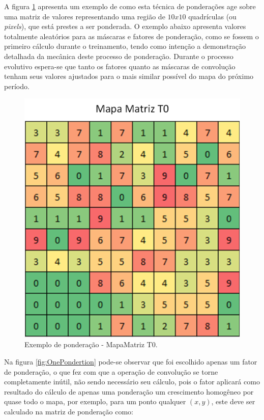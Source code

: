 A figura \ref{fig:MapaMatrizT0} apresenta um exemplo de como esta técnica de ponderações age sobre uma matriz de valores representando uma região de \(10x10\) quadrículas (ou \emph{pixels}), que está prestes a ser ponderada. O exemplo abaixo apresenta valores totalmente aleatórios para as máscaras e fatores de ponderação, como se fossem o primeiro cálculo durante o treinamento, tendo como intenção a demonstração detalhada da mecânica deste processo de ponderação. Durante o processo evolutivo espera-se que tanto os fatores quanto as máscaras de convolução tenham seus valores ajustados para o mais similar possível do mapa do próximo período. 

\begin{figure}[h]
	\centering	\includegraphics[scale=0.6]{Figuras/PonderationsExample-MatrixMap.png}
\caption{Exemplo de ponderação - MapaMatriz T0.}
\label{fig:MapaMatrizT0}
\end{figure}

Na figura \ref{fig:OnePondertion} pode-se observar que foi escolhido apenas um fator de ponderação, o que fez com que a operação de convolução se torne completamente inútil, não sendo necessário seu cálculo, pois o fator aplicará como resultado do cálculo de apenas uma ponderação um crescimento homogêneo por quase todo o mapa, por exemplo, para um ponto qualquer \((x,y)\), este deve ser calculado na matriz de ponderação como:

